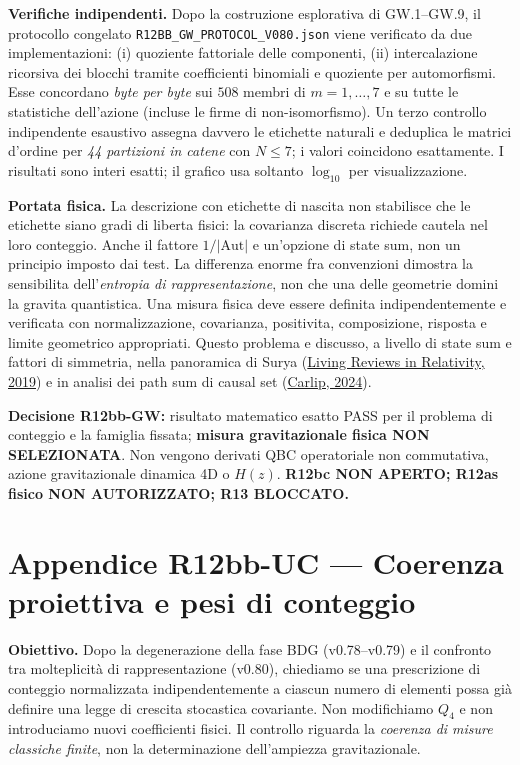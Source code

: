 \documentclass[11pt,a4paper]{article}
\begin{document}
\textbf{Verifiche indipendenti.} Dopo la costruzione esplorativa di GW.1--GW.9, il protocollo congelato \texttt{R12BB\_GW\_PROTOCOL\_V080.json} viene verificato da due implementazioni: (i) quoziente fattoriale delle componenti, (ii) intercalazione ricorsiva dei blocchi tramite coefficienti binomiali e quoziente per automorfismi. Esse concordano \emph{byte per byte} sui $508$ membri di $m=1,\ldots,7$ e su tutte le statistiche dell'azione (incluse le firme di non-isomorfismo). Un terzo controllo indipendente esaustivo assegna davvero le etichette naturali e deduplica le matrici d'ordine per \emph{44 partizioni in catene} con $N\le7$; i valori coincidono esattamente. I risultati sono interi esatti; il grafico usa soltanto $\log_{10}$ per visualizzazione.

\textbf{Portata fisica.} La descrizione con etichette di nascita non stabilisce che le etichette siano gradi di liberta fisici: la covarianza discreta richiede cautela nel loro conteggio. Anche il fattore $1/|\mathrm{Aut}|$ e un'opzione di state sum, non un principio imposto dai test. La differenza enorme fra convenzioni dimostra la sensibilita dell'\emph{entropia di rappresentazione}, non che una delle geometrie domini la gravita quantistica. Una misura fisica deve essere definita indipendentemente e verificata con normalizzazione, covarianza, positivita, composizione, risposta e limite geometrico appropriati. Questo problema e discusso, a livello di state sum e fattori di simmetria, nella panoramica di Surya (\href{https://doi.org/10.1007/s41114-019-0023-1}{Living Reviews in Relativity, 2019}) e in analisi dei path sum di causal set (\href{https://doi.org/10.1007/s10714-024-03281-1}{Carlip, 2024}).

\textbf{Decisione R12bb-GW:} risultato matematico esatto PASS per il problema di conteggio e la famiglia fissata; \textbf{misura gravitazionale fisica NON SELEZIONATA}. Non vengono derivati QBC operatoriale non commutativa, azione gravitazionale dinamica 4D o $H(z)$. \textbf{R12bc NON APERTO; R12as fisico NON AUTORIZZATO; R13 BLOCCATO.}

\clearpage
\section*{Appendice R12bb-UC --- Coerenza proiettiva e pesi di conteggio}
\textbf{Obiettivo.} Dopo la degenerazione della fase BDG (v0.78--v0.79) e il confronto tra molteplicit\`a di rappresentazione (v0.80), chiediamo se una prescrizione di conteggio normalizzata indipendentemente a ciascun numero di elementi possa gi\`a definire una legge di crescita stocastica covariante. Non modifichiamo $Q_4$ e non introduciamo nuovi coefficienti fisici. Il controllo riguarda la \emph{coerenza di misure classiche finite}, non la determinazione dell'ampiezza gravitazionale.
\end{document}
